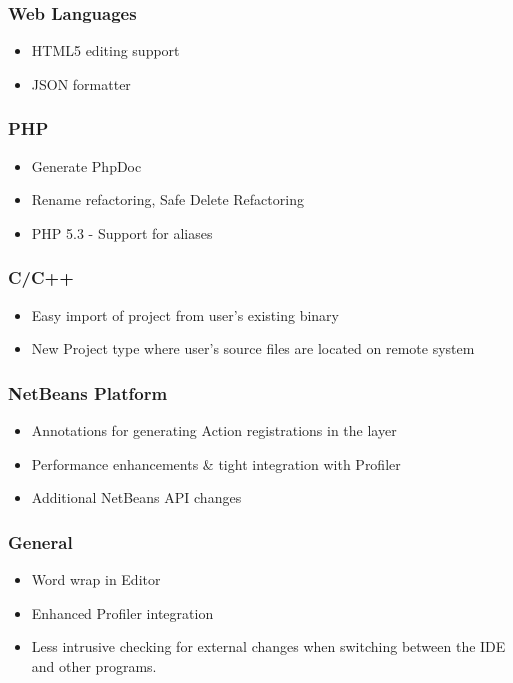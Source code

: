 \subsubsection{Web Languages}
\begin{itemize}
\item HTML5 editing support
\item JSON formatter
\end{itemize}
\subsubsection{PHP}
\begin{itemize}
\item Generate PhpDoc
\item Rename refactoring, Safe Delete Refactoring
\item PHP 5.3 - Support for aliases
\end{itemize}
\subsubsection{C/C++}
\begin{itemize}
\item Easy import of project from user's existing binary
\item New Project type where user's source files are located on remote system
\end{itemize}
\subsubsection{NetBeans Platform}
\begin{itemize}
\item Annotations for generating Action registrations in the layer
\item Performance enhancements \& tight integration with Profiler
\item Additional NetBeans API changes
\end{itemize}
\subsubsection{General}
\begin{itemize}
\item Word wrap in Editor
\item Enhanced Profiler integration
\item Less intrusive checking for external changes when switching between the IDE and other programs.
\end{itemize}

